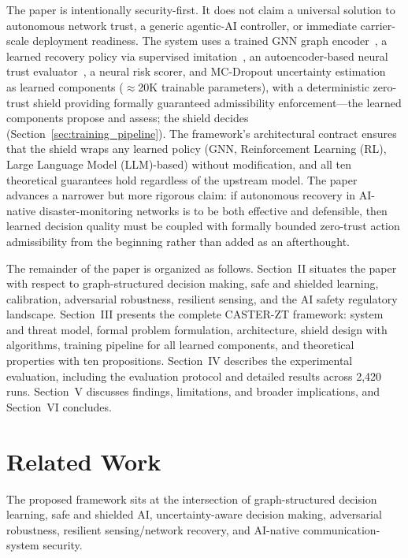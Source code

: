 \documentclass[10pt,journal,compsoc]{IEEEtran}
\begin{document}
The paper is intentionally security-first.
It does not claim a universal solution to autonomous network trust, a generic agentic-AI controller, or immediate carrier-scale deployment readiness.
The system uses a trained GNN graph encoder~\cite{hamilton2017graphsage}, a learned recovery policy via supervised imitation~\cite{hussein2017imitation}, an autoencoder-based neural trust evaluator~\cite{chalapathy2019deep}, a neural risk scorer, and MC-Dropout uncertainty estimation~\cite{gal2016dropout} as learned components ($\approx$20K trainable parameters), with a deterministic zero-trust shield providing formally guaranteed admissibility enforcement---the learned components propose and assess; the shield decides (Section~\ref{sec:training_pipeline}).
The framework's architectural contract ensures that the shield wraps any learned policy (GNN, Reinforcement Learning (RL), Large Language Model (LLM)-based) without modification, and all ten theoretical guarantees hold regardless of the upstream model.
The paper advances a narrower but more rigorous claim: if autonomous recovery in AI-native disaster-monitoring networks is to be both effective and defensible, then learned decision quality must be coupled with formally bounded zero-trust action admissibility from the beginning rather than added as an afterthought.

The remainder of the paper is organized as follows.
Section~II situates the paper with respect to graph-structured decision making, safe and shielded learning, calibration, adversarial robustness, resilient sensing, and the AI safety regulatory landscape.
Section~III presents the complete CASTER-ZT framework: system and threat model, formal problem formulation, architecture, shield design with algorithms, training pipeline for all learned components, and theoretical properties with ten propositions.
Section~IV describes the experimental evaluation, including the evaluation protocol and detailed results across 2,420 runs.
Section~V discusses findings, limitations, and broader implications, and Section~VI concludes.


\section{Related Work}

The proposed framework sits at the intersection of graph-structured decision learning, safe and shielded AI, uncertainty-aware decision making, adversarial robustness, resilient sensing/network recovery, and AI-native communication-system security.
\end{document}
